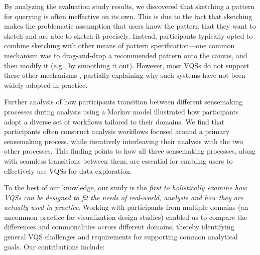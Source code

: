  \par By analyzing the evaluation study results, we discovered that sketching a pattern for querying is often ineffective on its own.  This is due to the fact that sketching makes the problematic assumption that users know the pattern that they want to sketch and are able to sketch it precisely. Instead, participants typically opted to combine sketching with other means of pattern specification---one common mechanism was to drag-and-drop a recommended pattern onto the canvas, and then modify it (e.g., by smoothing it out). However, most VQSs do not support these other mechanisms , partially explaining why such systems have not been widely adopted in practice. %
 \par Further analysis of how participants
 transition between different sensemaking processes
 during analysis using a Markov model illustrated
 how participants adopt a diverse set of workflows tailored
 to their domains. We find that participants often construct analysis workflows focused around a primary sensemaking process, while iteratively interleaving their analysis with the two other processes. This finding points to how all three sensemaking processes, along with seamless transitions between them, are essential for enabling users to effectively use VQSs for data exploration.%
 \par To the best of our knowledge, our study is the \emph{first to holistically examine how VQSs can be designed to fit the needs of real-world,  analysts and how they are actually used in practice}. Working with participants from multiple domains (an uncommon practice for visualization design studies) enabled us to compare the differences and commonalities across different domains, thereby identifying general VQS challenges and requirements for supporting common analytical goals. Our contributions include:
